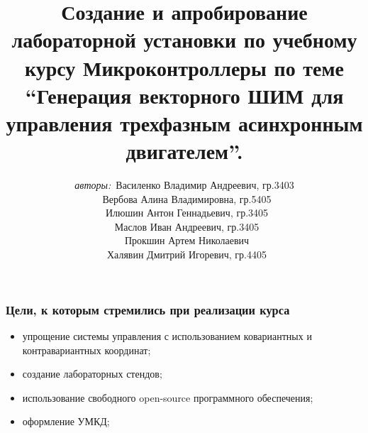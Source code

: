 \documentclass[14pt]{beamer}
\begin{document}
\title{\small{Создание и апробирование лабораторной установки по учебному курсу Микроконтроллеры по теме \enquote{Генерация векторного ШИМ для управления трехфазным асинхронным двигателем}.}}
\author{\small{%
\emph{авторы:}~Василенко Владимир Андреевич, гр.3403\\%
\emph{}~Вербова Алина Владимировна, гр.5405\\
\emph{}~Илюшин Антон Геннадьевич, гр.3405\\
\emph{}~Маслов Иван Андреевич, гр.3405\\
\emph{}~Прокшин Артем Николаевич\\%
\emph{}~Халявин Дмитрий Игоревич, гр.4405}}



\vspace{30pt}%

\vspace{60pt}%



\begin{frame}
\titlepage	
\end{frame}

\begin{frame}
\frametitle{\small Цели, к которым стремились при реализации курса} 
\begin{itemize}
\item упрощение системы управления с использованием ковариантных и контравариантных координат;
\item создание лабораторных стендов; %
\item использование свободного open-source программного обеспечения;
\item оформление УМКД;
\end{itemize}
\end{frame}
\end{document}
